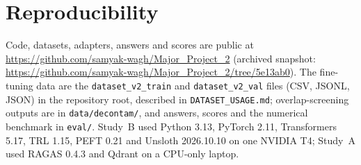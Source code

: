 \documentclass[conference]{IEEEtran}
\begin{document}
\section*{Reproducibility}
Code, datasets, adapters, answers and scores are public at \url{https://github.com/samyak-wagh/Major_Project_2} (archived snapshot: \url{https://github.com/samyak-wagh/Major_Project_2/tree/5e13ab0}). The fine-tuning data are the \texttt{dataset\_v2\_train} and \texttt{dataset\_v2\_val} files (CSV, JSONL, JSON) in the repository root, described in \texttt{DATASET\_USAGE.md}; overlap-screening outputs are in \texttt{data/decontam/}, and answers, scores and the numerical benchmark in \texttt{eval/}. Study~B used Python 3.13, PyTorch 2.11, Transformers 5.17, TRL 1.15, PEFT 0.21 and Unsloth 2026.10.10 on one NVIDIA T4; Study~A used RAGAS 0.4.3 and Qdrant on a CPU-only laptop.
\end{document}
